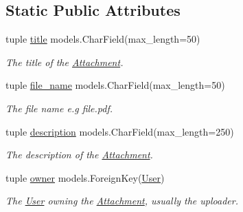 \subsection*{Static Public Attributes}
\begin{DoxyCompactItemize}
\item 
\hypertarget{class_learn_1_1models_1_1_attachment_a723dbad6b742dab4b2d86727cc281a9b}{tuple \hyperlink{class_learn_1_1models_1_1_attachment_a723dbad6b742dab4b2d86727cc281a9b}{title} models.\-Char\-Field(max\-\_\-length=50)}\label{class_learn_1_1models_1_1_attachment_a723dbad6b742dab4b2d86727cc281a9b}

\begin{DoxyCompactList}\small\item\em The title of the \hyperlink{class_learn_1_1models_1_1_attachment}{Attachment}. \end{DoxyCompactList}\item 
\hypertarget{class_learn_1_1models_1_1_attachment_a11126d7e4c4fde7af6b59962062cd2d0}{tuple \hyperlink{class_learn_1_1models_1_1_attachment_a11126d7e4c4fde7af6b59962062cd2d0}{file\-\_\-name} models.\-Char\-Field(max\-\_\-length=50)}\label{class_learn_1_1models_1_1_attachment_a11126d7e4c4fde7af6b59962062cd2d0}

\begin{DoxyCompactList}\small\item\em The file name e.\-g file.\-pdf. \end{DoxyCompactList}\item 
\hypertarget{class_learn_1_1models_1_1_attachment_acaf786996f915dbf370add35783e6194}{tuple \hyperlink{class_learn_1_1models_1_1_attachment_acaf786996f915dbf370add35783e6194}{description} models.\-Char\-Field(max\-\_\-length=250)}\label{class_learn_1_1models_1_1_attachment_acaf786996f915dbf370add35783e6194}

\begin{DoxyCompactList}\small\item\em The description of the \hyperlink{class_learn_1_1models_1_1_attachment}{Attachment}. \end{DoxyCompactList}\item 
tuple \hyperlink{class_learn_1_1models_1_1_attachment_a56f0ed9e935cf0f479db45afa52779a3}{owner} models.\-Foreign\-Key(\hyperlink{class_learn_1_1models_1_1_user}{User})
\begin{DoxyCompactList}\small\item\em The \hyperlink{class_learn_1_1models_1_1_user}{User} owning the \hyperlink{class_learn_1_1models_1_1_attachment}{Attachment}, usually the uploader. \end{DoxyCompactList}\end{DoxyCompactItemize}


